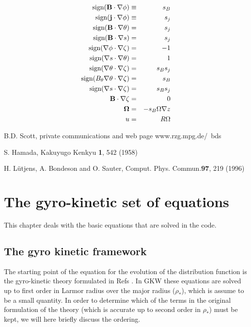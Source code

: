 \documentclass{report}
\def\bee{\begin{eqnarray}}
\def\eee{\end{eqnarray}}
\begin{document}
\bee
\textrm{sign}({\bf B} \cdot \nabla \phi)&\equiv& s_B \\
\textrm{sign}({\bf j} \cdot \nabla \phi)&\equiv&s_j \\
\textrm{sign}({\bf B} \cdot \nabla \theta)&=& s_j \\
\textrm{sign}({\bf B} \cdot \nabla s)&=& s_j \\
\textrm{sign}(\nabla \phi \cdot \nabla \zeta)&=& -1 \\
\textrm{sign}(\nabla s \cdot \nabla \theta)&=& 1\\
\textrm{sign}(\nabla \theta \cdot \nabla \zeta)&=& s_B s_j \\
\textrm{sign}(B_\theta \nabla \theta \cdot \nabla \zeta)&=& s_B \\
\textrm{sign}(\nabla s \cdot \nabla \zeta)&=& s_B s_j \\
{\bf B} \cdot \nabla \zeta&=& 0 \\
{\bf \Omega} &=& -s_B \Omega \nabla z \\
u &=& R \Omega 
\eee

\begin{thebibliography}{10}

 B.D. Scott, private communications and web page 
www.rzg.mpg.de/~bds

 S. Hamada, Kakuyugo Kenkyu {\bf 1}, 542 (1958)  

 H. L\"utjens, A. Bondeson and O. Sauter, Comput. Phys. Commun.{\bf 97}, 219 (1996)

\end{thebibliography}

\chapter{The gyro-kinetic set of equations }

This chapter deals with the basic equations that  are solved in the code. 

\section{The gyro kinetic framework}

The starting point of the equation for the evolution of the distribution function is the 
gyro-kinetic theory formulated in Refs \cite{LIT83,HAH88,BRI88,SUG00}. In GKW these equations 
are solved up to first order in Larmor radius over the major radius ($\rho_*$), which 
is assume to be a small quantity. In order to determine which of the terms in the 
original formulation of the theory (which is accurate up to second order in $\rho_*$) 
must be kept, we will here briefly discuss the ordering.
\end{document}
